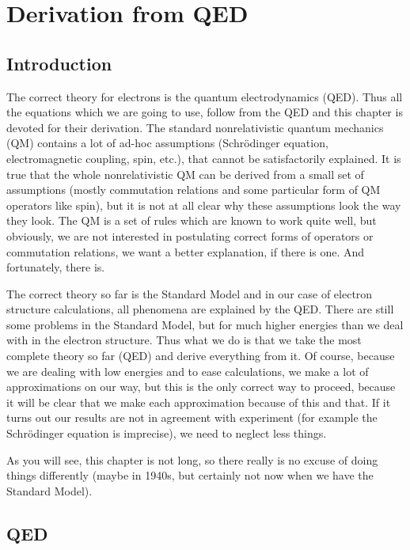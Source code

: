 \chapter{Derivation from QED}

\section{Introduction}

The correct theory for electrons is the quantum electrodynamics (QED). Thus all
the equations which we are going to use, follow from the QED and this chapter
is devoted for their derivation. The standard nonrelativistic quantum
mechanics (QM)
contains a lot of ad-hoc assumptions (Schr\"odinger equation, electromagnetic
coupling, spin, etc.), that cannot be satisfactorily explained. It is true that
the whole nonrelativistic QM can be derived from a small set of
assumptions (mostly commutation relations and some particular form of QM
operators like spin), but it is not at all clear why these assumptions look the
way they look. The QM is a set of rules which are known to work quite
well, but obviously, we are not interested in postulating correct forms of
operators or commutation relations, we want a better explanation, if there is
one. And fortunately, there is.

The correct theory so far is the Standard Model and in our case of electron
structure calculations, all phenomena are explained by the QED. There are still
some problems in the Standard Model, but for much higher energies than
we deal with in the electron structure. Thus what we do is that we take
the most complete theory so far (QED) and derive everything from it. Of course,
because we are dealing with low energies and to ease calculations, we make a
lot of approximations on our way, but this is the only correct way to
proceed, because it will be clear that we make each approximation because of
this and that. If it turns out our results are not in agreement with experiment
(for example the Schr\"odinger equation is imprecise), we need to neglect
less things. 

As you will see, this chapter is not long, so there really is no excuse of
doing things differently (maybe in 1940s, but certainly not now when we have
the Standard Model). 



\def\L{L}

\section{QED}

